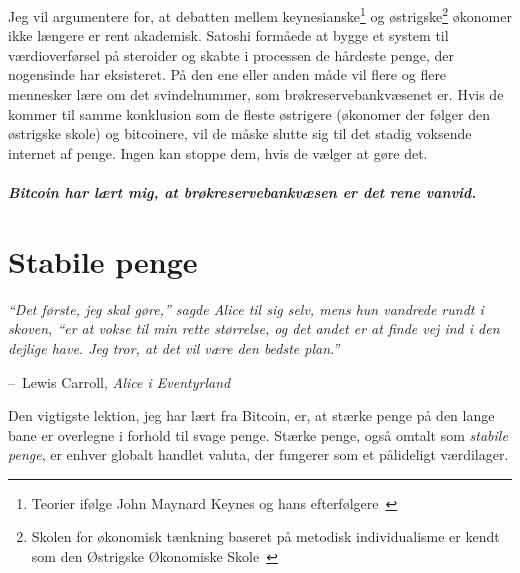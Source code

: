 \documentclass[paper=6in:9in,pagesize=pdftex,headinclude=on,footinclude=on,12pt]{scrbook}
\makeatletter
\newenvironment{chapquote}[2][4em]{\setlength{\@tempdima}{#1}%
   \def\chapquote@author{#2}%
   \parshape 1 \@tempdima \dimexpr\textwidth-2\@tempdima\relax%
   \itshape}{\par\normalfont\hfill--\ \chapquote@author\hspace*{\@tempdima}\par\bigskip}
\makeatother
\begin{document}
Jeg vil argumentere for, at debatten mellem keynesianske\footnote{Teorier ifølge John Maynard Keynes og hans efterfølgere~\cite{wiki:keynesian}} og østrigske\footnote{Skolen for økonomisk tænkning baseret på metodisk individualisme er kendt som den Østrigske Økonomiske Skole~\cite{wiki:austrian}} økonomer ikke længere er rent akademisk. Satoshi formåede at bygge et system til værdioverførsel på steroider og skabte i processen de hårdeste penge, der nogensinde har eksisteret. På den ene eller anden måde vil flere og flere mennesker lære om det svindelnummer, som brøkreservebankvæsenet er. Hvis de kommer til samme konklusion som de fleste østrigere (økonomer der følger den østrigske skole) og bitcoinere, vil de måske slutte sig til det stadig voksende internet af penge. Ingen kan stoppe dem, hvis de vælger at gøre det.\paragraph{Bitcoin har lært mig, at brøkreservebankvæsen er det rene vanvid.}%
%
%
%
%
%

\chapter{Stabile penge}
\label{les:14}

\begin{chapquote}{Lewis Carroll, \textit{Alice i Eventyrland}} \enquote{Det første, jeg skal gøre,} sagde Alice til sig selv, mens hun vandrede rundt i skoven, \enquote{er at vokse til min rette størrelse, og det andet er at finde vej ind i den dejlige have. Jeg tror, at det vil være den bedste plan.} \end{chapquote}

Den vigtigste lektion, jeg har lært fra Bitcoin, er, at stærke penge på den lange bane er overlegne i forhold til svage penge. Stærke penge, også omtalt som \textit{stabile penge}, er enhver globalt handlet valuta, der fungerer som et pålideligt værdilager.
\end{document}
